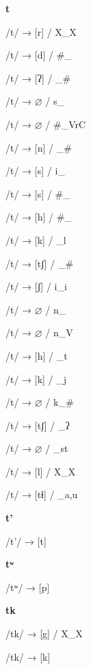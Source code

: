 \begin{center}\textbf{t}\end{center}
\begin{multicols}{4}
\noindent /t/ → [r] / X\_X

\noindent /t/ → [d] / \#\_

\noindent /t/ → [ʔ] / \_\#

\noindent /t/ → $\varnothing$ / s\_

\noindent /t/ → $\varnothing$ / \#\_VrC

\noindent /t/ → [n] / \_\#

\noindent /t/ → [s] / i\_

\noindent /t/ → [s] / \#\_

\noindent /t/ → [h] / \#\_

\noindent /t/ → [k] / \_l

\noindent /t/ → [tʃ] / \_\#

\noindent /t/ → [ʃ] / i\_i

\noindent /t/ → $\varnothing$ / n\_

\noindent /t/ → $\varnothing$ / n\_V

\noindent /t/ → [h] / \_t

\noindent /t/ → [k] / \_j

\noindent /t/ → $\varnothing$ / k\_\#

\noindent /t/ → [tʃ] / \_ʔ

\noindent /t/ → $\varnothing$ / \_st

\noindent /t/ → [l] / X\_X

\noindent /t/ → [tɬ] / \_{a,u}

\end{multicols}

\begin{center}\textbf{t'}\end{center}
\begin{multicols}{4}
\noindent /t'/ → [t]

\end{multicols}

\begin{center}\textbf{tʷ}\end{center}
\begin{multicols}{4}
\noindent /tʷ/ → [p]

\end{multicols}

\begin{center}\textbf{tk}\end{center}
\begin{multicols}{4}
\noindent /tk/ → [g] / X\_X

\noindent /tk/ → [k]

\end{multicols}

